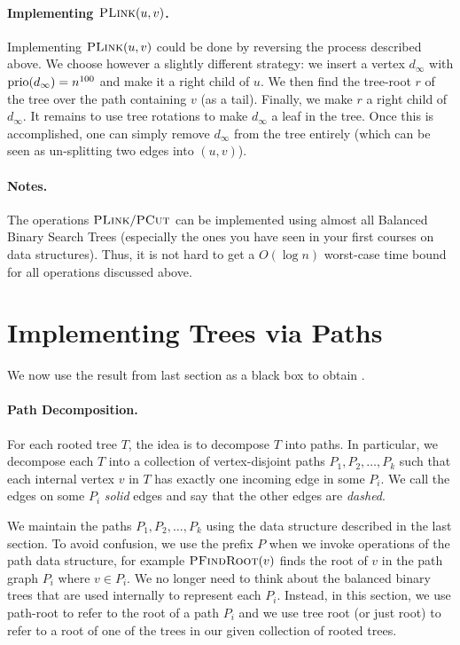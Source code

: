\paragraph{Implementing $\textsc{PLink}(u,v)$.} Implementing $\textsc{PLink}(u,v)$ could be done by reversing the process described above. We choose however a slightly different strategy: we insert a vertex $d_{\infty}$ with $\operatorname{prio}(d_{\infty}) = n^{100}$ and make it a right child of $u$. We then find the tree-root $r$ of the tree over the path containing $v$ (as a tail). Finally, we make $r$ a right child of $d_{\infty}$. It remains to use tree rotations to make $d_{\infty}$ a leaf in the tree.  Once this is accomplished, one can simply remove $d_{\infty}$ from the tree entirely (which can be seen as un-splitting two edges into $(u,v)$).  

\paragraph{Notes.} The operations $\textsc{PLink}/ \textsc{PCut}$ can be implemented using almost all Balanced Binary Search Trees (especially the ones you have seen in your first courses on data structures). Thus, it is not hard to get a $O(\log n)$ worst-case time bound for all operations discussed above.

\section{Implementing Trees via Paths}

We now use the result from last section as a black box to obtain .

\paragraph{Path Decomposition.} For each rooted tree $T$, the idea is to decompose $T$ into paths. In particular, we decompose each $T$ into a collection of vertex-disjoint paths $P_1, P_2, \dots, P_k$ such that each internal vertex $v$ in $T$ has exactly one incoming edge in some $P_i$. We call the edges on some $P_i$  \emph{solid} edges and say that the other edges are \emph{dashed}. 

We maintain the paths $P_1, P_2, \dots, P_k$ using the data structure described in the last section. To avoid confusion, we use the prefix $P$ when we invoke operations of the path data structure, for example $\textsc{PFindRoot}(v)$ finds the root of $v$ in the path graph $P_i$ where $v \in P_i$.
We no longer need to think about the balanced binary trees that are used internally to represent each $P_i$. Instead, in this section, we use path-root to refer to the root of a path $P_i$ and we use tree root (or just root) to refer to a root of one of the trees in our given collection of rooted trees.

